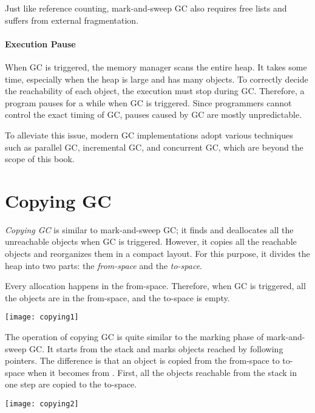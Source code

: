 Just like reference counting, mark-and-sweep GC also requires free lists and
suffers from external fragmentation.

\paragraph{Execution Pause}

When GC is triggered, the memory manager scans the entire heap. It takes some
time, especially when the heap is large and has many objects. To correctly decide
the reachability of each object, the execution must stop during GC. Therefore,
a program pauses for a while when GC is triggered. Since programmers cannot
control the exact timing of GC, pauses caused by GC are mostly unpredictable.

To alleviate this issue, modern GC implementations adopt various techniques such
as parallel GC, incremental GC, and concurrent GC, which are beyond the scope of
this book.

\section{Copying GC}

\textit{Copying GC} is similar to
mark-and-sweep GC; it finds and deallocates all the unreachable objects when GC
is triggered. However, it copies all the reachable objects and reorganizes them in
a compact layout. For this purpose, it divides the heap into two parts: the
\textit{from-space} and the \textit{to-space}.

Every allocation happens in the from-space. Therefore, when GC is triggered,
all the objects are in the from-space, and the to-space is empty.

\begin{center}
\texttt{[image: copying1]}
\end{center}

The operation of copying GC is quite similar to the marking phase of
mark-and-sweep GC. It starts from the stack and marks objects reached by following
pointers. The difference is that an object is copied from the from-space to
to-space when it becomes \uscn from \urch. First, all the objects
reachable from the stack in one step are copied to the to-space.

\begin{center}
\texttt{[image: copying2]}
\end{center}

